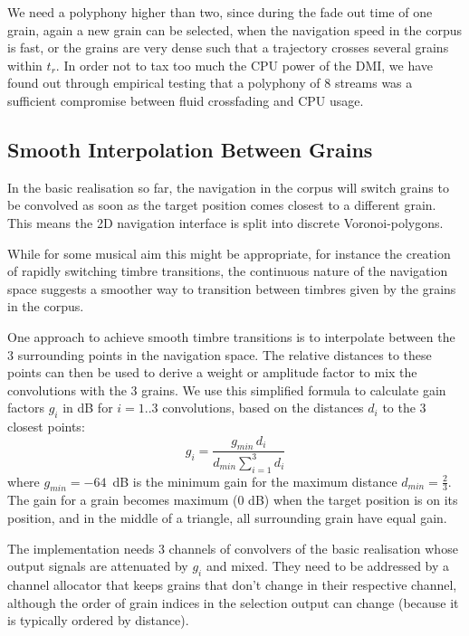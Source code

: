 We need a polyphony higher than two, since during the fade out time of one grain, again a new grain can be selected, when the navigation speed in the corpus is fast, or the grains are very dense such that a trajectory crosses several grains within $t_r$. In order not to tax too much the CPU power of the DMI, we have found out through empirical testing that a polyphony of 8 streams was a sufficient compromise between fluid crossfading and CPU usage.

\subsection{Smooth Interpolation Between Grains}\label{sec:mix}

In the basic realisation so far, the navigation in the corpus will switch grains to be convolved as soon as the target position comes closest to a different grain.  
This means the 2D navigation interface is split into discrete Voronoi-polygons.

While for some musical aim this might be appropriate, for instance the creation of rapidly switching timbre transitions, the continuous nature of the navigation space suggests a smoother way to transition between timbres given by the grains in the corpus.

One approach to achieve smooth timbre transitions is to interpolate between the 3 surrounding points in the navigation space.  The relative distances to these points can then be used to derive a weight or amplitude factor \cite{FreedMacCallumSchmederWessel-nime2010-hybridization-interfaces} to mix the convolutions with the 3 grains.  We use this simplified formula to calculate gain factors $g_i$ in dB for $i = 1..3$ convolutions, based on the distances $d_i$ to the 3 closest points:
%
\begin{equation}
  g_i = \frac{g_{min} \, d_i}{d_{min} \sum_{i=1}^3 d_i}
\end{equation}
%
where $g_{min} = -64$~dB is the minimum gain for the maximum distance $d_{min} = \frac{2}{3}$.
The gain for a grain becomes maximum (0 dB) when the target position is on its position, and in the middle of a triangle, all surrounding grain have equal gain.

The implementation needs 3 channels of convolvers of the basic realisation whose output signals are attenuated by $g_i$ and mixed.  They need to be addressed by a channel allocator that keeps grains that don't change in their respective channel, although the order of grain indices in the selection output can change (because it is typically ordered by distance).

